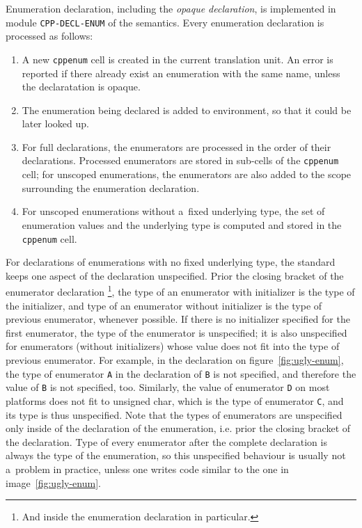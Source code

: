 \documentclass{fithesis3}
\begin{document}
Enumeration declaration, including the \textit{opaque declaration}, is implemented in module \texttt{CPP-DECL-ENUM} of the semantics.
Every enumeration declaration is processed as follows:
\begin{enumerate}
\item A new \texttt{cppenum} cell is created in the current translation unit. An error is reported if there already exist an enumeration with the same name, unless the declaratation is opaque.
\item The enumeration being declared is added to environment, so that it could be later looked up.
\item For full declarations, the enumerators are processed in the order of their declarations. Processed enumerators are stored in sub-cells of the \texttt{cppenum} cell; for unscoped enumerations, the enumerators are also added to the scope surrounding the enumeration declaration.
\item For unscoped enumerations without a~fixed underlying type, the set of enumeration values and the underlying type is computed and stored in the \texttt{cppenum} cell.
\end{enumerate}

For declarations of enumerations with no fixed underlying type, the standard keeps one aspect of the declaration unspecified. Prior the closing bracket of the enumerator declaration
\footnote{And inside the enumeration declaration in particular.},
the type of an enumerator with initializer is the type of the initializer, and type of an enumerator without initializer is the type of previous enumerator, whenever possible. If there is no initializer specified for the first enumerator, the type of the enumerator is unspecified; it is also unspecified for enumerators (without initializers) whose value does not fit into the type of previous enumerator. 
For example, in the declaration on figure~\ref{fig:ugly-enum}, the type of enumerator \lstinline{A}{} in the declaration of \lstinline{B}{} is not specified, and therefore the value of \lstinline{B}{} is not specified, too. Similarly, the value of enumerator \lstinline{D}{} on most platforms does not fit to unsigned char, which is the type of enumerator \lstinline{C}{}, and its type is thus unspecified. Note that the types of enumerators are unspecified only inside of the declaration of the enumeration, i.e. prior the closing bracket of the declaration. Type of every enumerator after the complete declaration is always the type of the enumeration, so this unspecified behaviour is usually not a~problem in practice, unless one writes code similar to the one in image~\ref{fig:ugly-enum}.
\end{document}
